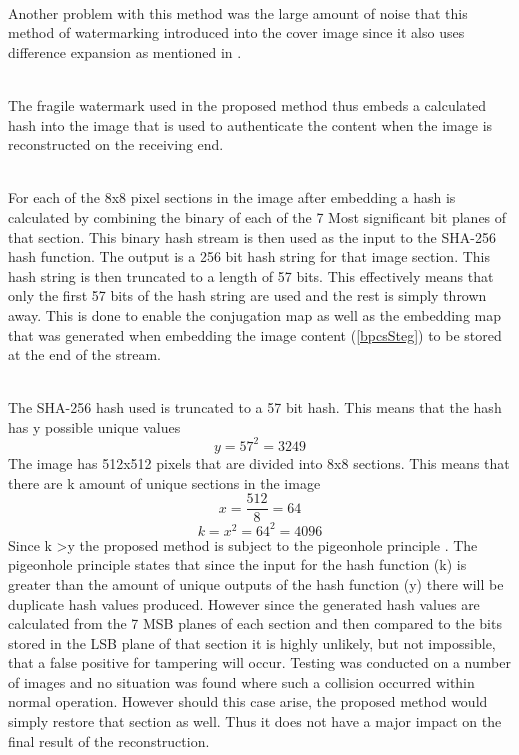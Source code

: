 \documentclass[12pt]{article}
\begin{document}
\hspace{0pt} \\
Another problem with this method was the large amount of noise that this method of watermarking introduced into the cover image since it also uses difference expansion as mentioned in \cite{tian2002reversible}.

\hspace{0pt} \\
The fragile watermark used in the proposed method thus embeds a calculated hash into the image that is used to authenticate the content when the image is reconstructed on the receiving end.

\hspace{0pt} \\
For each of the 8x8 pixel sections in the image after embedding a hash is calculated by combining the binary of each of the 7 Most significant bit planes of that section. This binary hash stream is then used as the input to the SHA-256 hash function.
The output is a 256 bit hash string for that image section.
This hash string is then truncated to a length of 57 bits.
This effectively means that only the first 57 bits of the hash string are used and the rest is simply thrown away.
This is done to enable the conjugation map as well as the embedding map that was generated when embedding the image content (\ref{bpcsSteg}) to be stored at the end of the stream.

\hspace{0pt} \\
The SHA-256 hash used is truncated to a 57 bit hash. 
This means that the hash has y possible unique values 
\[ y = 57^2 = 3249 \]
The image has 512x512 pixels that are divided into 8x8 sections.
This means that there are k amount of unique sections in the image
\[x = \frac{512}{8} = 64 \]
\[k = x^2 =64^2 = 4096 \]
Since k \textgreater y the proposed method is subject to the pigeonhole principle \cite{cook1976short}.
The pigeonhole principle states that since the input for the hash function (k) is greater than the amount of unique outputs of the hash function (y) there will be duplicate hash values produced.
However since the generated hash values are calculated from the 7 MSB planes of each section and then compared to the bits stored in the LSB plane of that section it is highly unlikely, but not impossible, that a false positive for tampering will occur. Testing was conducted on a number of images and no situation was found where such a collision occurred within normal operation.
However should this case arise, the proposed method would simply restore that section as well.
Thus it does not have a major impact on the final result of the reconstruction.
\end{document}
